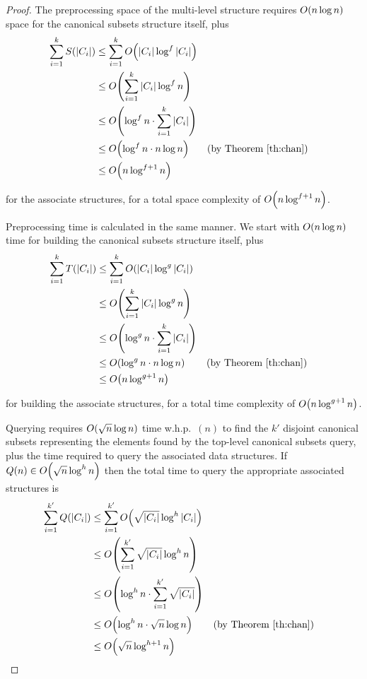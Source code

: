 \begin{proof}
The preprocessing space of the multi-level structure requires $O\!\left(n \log{n}\right)$ space for the canonical subsets structure itself, plus
\begin{align*}
\sum_{i=1}^k{S(|C_i|)}
&\leq \sum_{i=1}^k{\BigOh{|C_i| \log^f{|C_i|}}} \\
%
&\leq \BigOh{\sum_{i=1}^k{|C_i| \log^f{n}}} \\
%
&\leq \BigOh{\log^f{n} \cdot \sum_{i=1}^k{|C_i|}} \\
%
&\leq \BigOh{\log^f{n} \cdot n \log{n}} && \text{(by Theorem \ref{th:chan})}\\
%
&\leq \BigOh{n\log^{f+1}{n}} \\
\end{align*}

\noindent for the associate structures, for a total space complexity of $O\!\left(n\log^{f+1}{n}\right)$.

Preprocessing time is calculated in the same manner. 
We start with $O\!\left(n \log{n}\right)$ time for building the canonical subsets structure itself, plus
\begin{align*}
\sum_{i=1}^k{T(|C_i|)}
&\leq \sum_{i=1}^k{\BigOh{|C_i| \log^g{|C_i|}}} \\
%
&\leq \BigOh{\sum_{i=1}^k{|C_i| \log^g{n}}} \\
%
&\leq \BigOh{\log^g{n} \cdot \sum_{i=1}^k{|C_i|}} \\
%
&\leq \BigOh{\log^g{n} \cdot n \log{n}} && \text{(by Theorem \ref{th:chan})} \\
%
&\leq \BigOh{n\log^{g+1}{n}} \\
\end{align*}

\noindent for building the associate structures, for a total time complexity of $O\!\left(n\log^{g+1}{n}\right)$.

Querying requires $O\!\left(\sqrt{n}\log{n}\right)$ time w.h.p.~$(n)$ to find the $k'$ disjoint canonical subsets representing the elements found by the top-level canonical subsets query, plus the time required to query the associated data structures.  
If $Q(n) \in O\!\left(\sqrt{n}\log^h{n}\right)$ then the total time to query the appropriate associated structures is
\begin{align*}
\sum_{i=1}^{k'}{Q(|C_i|)}
&\leq \sum_{i=1}^{k'}{\BigOh{\sqrt{|C_i|}\log^h{|C_i|}}} \\
%
&\leq \BigOh{\sum_{i=1}^{k'}{\sqrt{|C_i|}\log^h{n}}} \\
%
&\leq \BigOh{\log^h{n} \cdot \sum_{i=1}^{k'}{\sqrt{|C_i|}}} \\
%
&\leq \BigOh{\log^h{n} \cdot \sqrt{n}\log{n}}  && \text{(by Theorem \ref{th:chan})} \\
%
&\leq \BigOh{\sqrt{n}\log^{h+1}{n}} \\
\end{align*}


\end{proof}
